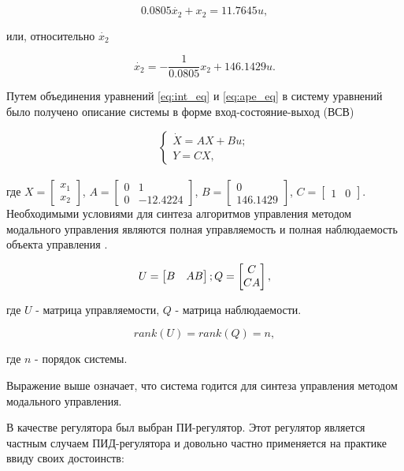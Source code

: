 $$
  0.0805\dot{x_2} + x_2 = 11.7645u,
$$

или, относительно $\dot{x_2}$

\begin{equation}
  \dot{x_2}=-\frac{1}{0.0805}x_2+146.1429u.
  \label{eq:ape_eq}
\end{equation}

Путем объединения уравнений \ref{eq:int_eq} и \ref{eq:ape_eq} в систему уравнений было получено
описание системы в форме вход-состояние-выход (ВСВ)

$$
  \begin{cases}
    \dot{X}=AX+Bu;
    \\
    Y=CX,
  \end{cases}
$$\\

где $X=\begin{bmatrix}x_1\\x_2\end{bmatrix}$, $A=\begin{bmatrix}0&1\\0& -12.4224\end{bmatrix}$, 
$B=\begin{bmatrix}0\\146.1429\end{bmatrix}$, $C=\begin{bmatrix}1&0\end{bmatrix}$.\\

Необходимыми условиями для синтеза алгоритмов управления методом модального управления
являются полная управляемость и полная наблюдаемость объекта управления \cite{МодальноеУправление}.

$$
  U = \begin{bmatrix}B&AB\end{bmatrix};
  \\
  Q = \begin{bmatrix}C\\CA\end{bmatrix},
$$

где $U$ - матрица управляемости, $Q$ - матрица наблюдаемости.

$$
  rank(U) = rank(Q) = n,
$$

где $n$ - порядок системы.

Выражение выше означает, что система годится для синтеза управления методом
модального управления.

В качестве регулятора был выбран ПИ-регулятор. Этот регулятор является частным случаем ПИД-регулятора
и довольно частно применяется на практике ввиду своих достоинств:

